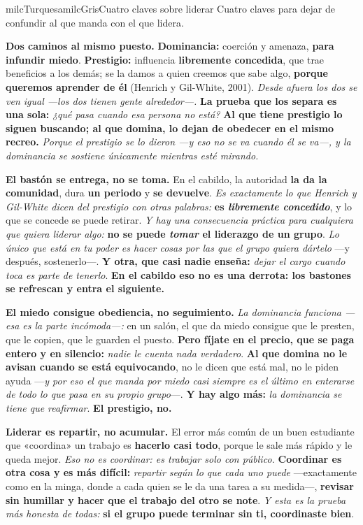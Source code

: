 \documentclass[11pt,letterpaper]{article}
\newcommand{\milcpaso}[3]{%
\Needspace{4\baselineskip}%
\begin{tcolorbox}[enhanced,colback=white,colframe=milcLinea,arc=1.5mm,boxrule=.9pt,
  left=14mm,right=4mm,top=3mm,bottom=3mm,before skip=4pt,after skip=4pt,
  fontupper=\RaggedRight,
  overlay={\node[anchor=north west,circle,fill=#2,text=white,inner sep=0pt,
    minimum size=7.4mm,font=\sffamily\bfseries\small]
    at ([xshift=3.6mm,yshift=-3.2mm]frame.north west) {#1};}]
#3
\end{tcolorbox}}
\begin{document}
\begin{softbox}{milcTurquesa}{milcGris}{Cuatro claves sobre liderar}
Cuatro claves para dejar de confundir al que manda con el que lidera.
\end{softbox}

\milcpaso{1}{milcTurquesa}{\textbf{Dos caminos al mismo puesto.} \textbf{Dominancia:} coerción y amenaza, \textbf{para infundir miedo}. \textbf{Prestigio:} influencia \textbf{libremente concedida}, que trae beneficios a los demás; se la damos a quien creemos que sabe algo, \textbf{porque queremos aprender de él} (Henrich y Gil-White, 2001). \emph{Desde afuera los dos se ven igual ---los dos tienen gente alrededor---.} \textbf{La prueba que los separa es una sola:} \emph{¿qué pasa cuando esa persona no está?} \textbf{Al que tiene prestigio lo siguen buscando; al que domina, lo dejan de obedecer en el mismo recreo.} \emph{Porque el prestigio se lo dieron ---y eso no se va cuando él se va---, y la dominancia se sostiene únicamente mientras esté mirando.}}
\milcpaso{2}{milcTurquesa}{\textbf{El bastón se entrega, no se toma.} En el cabildo, la autoridad \textbf{la da la comunidad}, dura \textbf{un periodo} y \textbf{se devuelve}. \emph{Es exactamente lo que Henrich y Gil-White dicen del prestigio con otras palabras:} \textbf{es \emph{libremente concedido}}, y lo que se concede se puede retirar. \emph{Y hay una consecuencia práctica para cualquiera que quiera liderar algo:} \textbf{no se puede \emph{tomar} el liderazgo de un grupo}. \emph{Lo único que está en tu poder es hacer cosas por las que el grupo quiera dártelo} ---y después, sostenerlo---. \textbf{Y otra, que casi nadie enseña:} \emph{dejar el cargo cuando toca es parte de tenerlo}. \textbf{En el cabildo eso no es una derrota: los bastones se refrescan y entra el siguiente.}}
\milcpaso{3}{milcTurquesa}{\textbf{El miedo consigue obediencia, no seguimiento.} \emph{La dominancia funciona ---esa es la parte incómoda---:} en un salón, el que da miedo consigue que le presten, que le copien, que le guarden el puesto. \textbf{Pero fíjate en el precio, que se paga entero y en silencio:} \emph{nadie le cuenta nada verdadero}. \textbf{Al que domina no le avisan cuando se está equivocando}, no le dicen que está mal, no le piden ayuda ---\emph{y por eso el que manda por miedo casi siempre es el último en enterarse de todo lo que pasa en su propio grupo}---. \textbf{Y hay algo más:} \emph{la dominancia se tiene que reafirmar}. \textbf{El prestigio, no.}}
\milcpaso{4}{milcTurquesa}{\textbf{Liderar es repartir, no acumular.} El error más común de un buen estudiante que «coordina» un trabajo es \textbf{hacerlo casi todo}, porque le sale más rápido y le queda mejor. \emph{Eso no es coordinar: es trabajar solo con público.} \textbf{Coordinar es otra cosa y es más difícil:} \emph{repartir según lo que cada uno puede} ---exactamente como en la minga, donde a cada quien se le da una tarea a su medida---, \textbf{revisar sin humillar y hacer que el trabajo del otro se note}. \emph{Y esta es la prueba más honesta de todas:} \textbf{si el grupo puede terminar sin ti, coordinaste bien}.}
\end{document}
